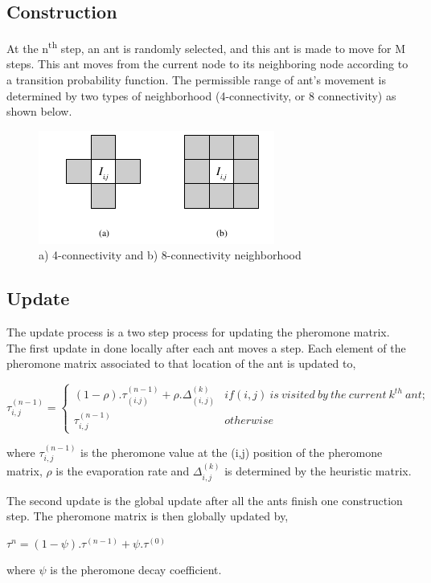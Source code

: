 \documentclass[paper=a4, fontsize=11pt]{scrartcl}
\numberwithin{equation}{section}		%
\numberwithin{figure}{section}			%
\numberwithin{table}{section}				%
\begin{document}
\subsection{Construction}
At the n\textsuperscript{th} step, an ant is randomly selected, and this ant is made to move for M steps. This ant moves from the current node to its neighboring node according to a transition probability function. The permissible range of ant's movement is determined by two types of neighborhood (4-connectivity, or 8 connectivity) as shown below. 

\begin{figure}[h!]
\centering
\includegraphics[scale=0.6]{Selection_006.png}
\caption {a) 4-connectivity and b) 8-connectivity neighborhood}
\end{figure}

\subsection{Update}
The update process is a two step process for updating the pheromone matrix.
The first update in done locally after each ant moves a step. Each element of the pheromone matrix associated to that location of the ant is updated to, 

\begin{center}
$\tau_{i,j}^{(n-1)}=\begin{cases}(1 - \rho).\tau_{(i.j)}^{(n-1)}+ \rho.\Delta_{(i,j)}^{(k)} & if (i,j)\ is\ visited\ by\ the\ current\ k^{th}\ ant ;\\ \tau_{i,j}^{(n-1)} & otherwise\end{cases}$
\end{center} where $\tau_{i,j}^{(n-1)}$ is the pheromone value at the (i,j) position of the pheromone matrix, $\rho$ is the evaporation rate and $\Delta_{i,j}^{(k)}$ is determined by the heuristic matrix.

The second update is the global update after all the ants finish one construction step. The pheromone matrix is then globally updated by, 
\begin{center}
$\tau^{n} = ( 1 - \psi). \tau^{(n-1)}+ \psi.\tau^{(0)}$
\end{center} where $\psi$ is the pheromone decay coefficient.
\end{document}
